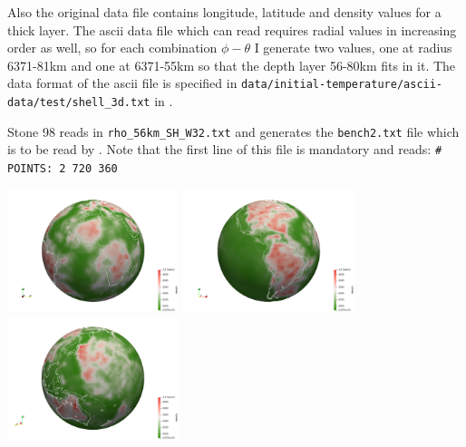 Also the original data file contains longitude, latitude and density values for 
a thick layer. The ascii data file which \aspect can read requires radial values 
in increasing order as well, 
so for each combination $\phi-\theta$ I generate two values, one at 
radius 6371-81km and one at 6371-55km so that the depth layer 56-80km fits in it.
The data format of the ascii file is specified in 
{\tt data/initial-temperature/ascii-data/test/shell\_3d.txt} in \aspect{}.

Stone 98 reads in {\tt rho\_56km\_SH\_W32.txt} 
and generates the {\tt bench2.txt} file which is to be read by \aspect{}.
Note that the first line of this file is mandatory and reads: 
{\tt \# POINTS: 2 720 360}

\begin{center}
\includegraphics[width=5cm]{./images/benchmark_gravity/bench2/dens1}
\includegraphics[width=5cm]{./images/benchmark_gravity/bench2/dens2}
\includegraphics[width=5cm]{./images/benchmark_gravity/bench2/dens3}
\end{center}


